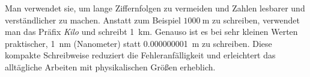 Man verwendet sie, um lange Ziffernfolgen zu vermeiden und Zahlen lesbarer und verständlicher zu machen. Anstatt zum Beispiel $\SI{1000}{\meter}$ zu schreiben, verwendet man das Präfix \textit{Kilo} und schreibt \SI{1}{\kilo\meter}. Genauso ist es bei sehr kleinen Werten praktischer, \SI{1}{\nano\meter} (Nanometer) statt \SI{0,000000001}{\meter} zu schreiben. Diese kompakte Schreibweise reduziert die Fehleranfälligkeit und erleichtert das alltägliche Arbeiten mit physikalischen Größen erheblich.


